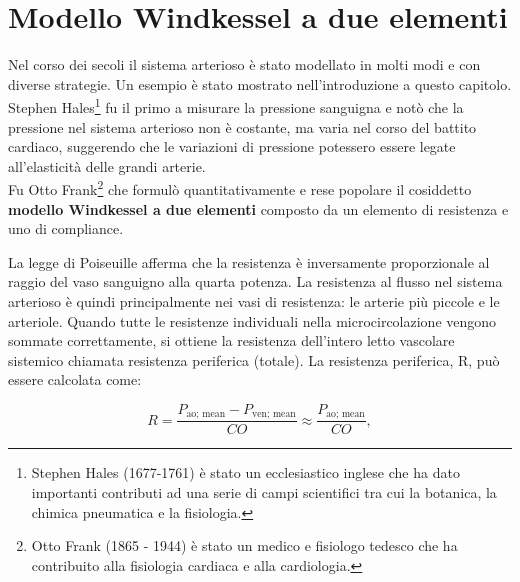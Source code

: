 \newpage

\section{Modello Windkessel a due elementi}
Nel corso dei secoli il sistema arterioso è stato modellato in molti modi e con diverse strategie. Un esempio è stato mostrato nell'introduzione a questo capitolo.
Stephen Hales\footnote{Stephen Hales (1677-1761) è stato un ecclesiastico inglese che ha dato importanti contributi ad una serie di campi scientifici tra cui la botanica, la chimica pneumatica e la fisiologia.}  fu il primo a misurare la pressione sanguigna e
notò che la pressione nel sistema arterioso non è costante,
ma varia nel corso del battito cardiaco, suggerendo che
le variazioni di pressione potessero essere legate all'elasticità delle  grandi arterie. \\
Fu Otto Frank\footnote{Otto Frank (1865 - 1944) è stato un medico e fisiologo tedesco che ha contribuito alla fisiologia cardiaca e alla cardiologia.} che formulò quantitativamente e rese popolare il cosiddetto \textbf{modello Windkessel a due elementi}
composto da un elemento di resistenza e uno di compliance.


La legge di Poiseuille afferma che la resistenza è inversamente proporzionale al raggio del vaso sanguigno alla quarta potenza. La
resistenza al flusso nel sistema arterioso è quindi principalmente
nei vasi di resistenza: le arterie più piccole e le
arteriole. Quando tutte le resistenze individuali nella microcircolazione vengono sommate correttamente, si ottiene la resistenza dell'intero
letto vascolare sistemico chiamata 
resistenza periferica (totale). La resistenza periferica, R, può
essere calcolata come:

\begin{equation}\label{R}
R = \frac{ P_{\text{ao; mean}}-P_{\text{ven; mean}}}{CO}\approx \frac{ P_{\text{ao; mean}}}{CO},
\end{equation}

